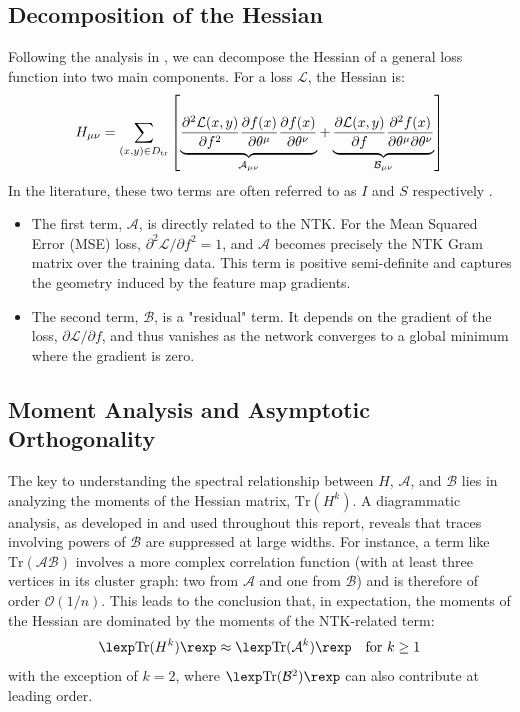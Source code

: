 \documentclass[a4paper]{article}
\begin{document}
\subsection{Decomposition of the Hessian}
Following the analysis in \cite{dyer2019asymptotics}, we can decompose the Hessian of a general loss function into two main components. For a loss $\mathcal{L}$, the Hessian is:
\begin{equation}
H_{\mu\nu} = \sum_{(x,y)\in D_{\rm tr}}\left[\underbrace{\frac{\partial^{2}\mathcal{L}(x,y)}{\partial f^{2}}\frac{\partial f(x)}{\partial\theta^{\mu}}\frac{\partial f(x)}{\partial\theta^{\nu}}}_{\mathcal{A}_{\mu\nu}}
+ \underbrace{\frac{\partial\mathcal{L}(x,y)}{\partial f}\frac{\partial^{2}f(x)}{\partial\theta^{\mu}\partial\theta^{\nu}}}_{\mathcal{B}_{\mu\nu}}\right]
\end{equation}
In the literature, these two terms are often referred to as $I$ and $S$ respectively \cite{jacot2020kernelhessian}.
\begin{itemize}
    \item The first term, $\mathcal{A}$, is directly related to the NTK. For the Mean Squared Error (MSE) loss, $\partial^2\mathcal{L}/\partial f^2 = 1$, and $\mathcal{A}$ becomes precisely the NTK Gram matrix over the training data. This term is positive semi-definite and captures the geometry induced by the feature map gradients.
    \item The second term, $\mathcal{B}$, is a "residual" term. It depends on the gradient of the loss, $\partial\mathcal{L}/\partial f$, and thus vanishes as the network converges to a global minimum where the gradient is zero.
\end{itemize}

\subsection{Moment Analysis and Asymptotic Orthogonality}
The key to understanding the spectral relationship between $H$, $\mathcal{A}$, and $\mathcal{B}$ lies in analyzing the moments of the Hessian matrix, $\mathrm{Tr}(H^k)$.
A diagrammatic analysis, as developed in \cite{dyer2019asymptotics} and used throughout this report, reveals that traces involving powers of $\mathcal{B}$ are suppressed at large widths. For instance, a term like $\mathrm{Tr}(\mathcal{A}\mathcal{B})$ involves a more complex correlation function (with at least three vertices in its cluster graph: two from $\mathcal{A}$ and one from $\mathcal{B}$) and is therefore of order $\mathcal{O}(1/n)$. This leads to the conclusion that, in expectation, the moments of the Hessian are dominated by the moments of the NTK-related term:
\begin{equation}
\lexp \mathrm{Tr}(H^k) \rexp \approx \lexp \mathrm{Tr}(\mathcal{A}^k) \rexp \quad \text{for } k \ge 1
\end{equation}
with the exception of $k=2$, where $\lexp \mathrm{Tr}(\mathcal{B}^2) \rexp$ can also contribute at leading order.
\end{document}
